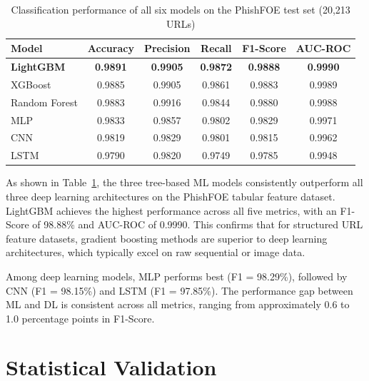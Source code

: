 \begin{table}[H]
    \caption{Classification performance of all six models on the PhishFOE test set (20,213 URLs)}
    \label{tab:perf_metrics}
    \vspace{6pt}
    \centering
    \begin{tabular}{|l|c|c|c|c|c|}
        \hline
        \textbf{Model} & \textbf{Accuracy} & \textbf{Precision} & \textbf{Recall} & \textbf{F1-Score} & \textbf{AUC-ROC} \\
        \hline
        \textbf{LightGBM}  & \textbf{0.9891} & \textbf{0.9905} & \textbf{0.9872} & \textbf{0.9888} & \textbf{0.9990} \\
        \hline
        XGBoost        & 0.9885 & 0.9905 & 0.9861 & 0.9883 & 0.9989 \\
        \hline
        Random Forest  & 0.9883 & 0.9916 & 0.9844 & 0.9880 & 0.9988 \\
        \hline
        MLP            & 0.9833 & 0.9857 & 0.9802 & 0.9829 & 0.9971 \\
        \hline
        CNN            & 0.9819 & 0.9829 & 0.9801 & 0.9815 & 0.9962 \\
        \hline
        LSTM           & 0.9790 & 0.9820 & 0.9749 & 0.9785 & 0.9948 \\
        \hline
    \end{tabular}
\end{table}

As shown in Table~\ref{tab:perf_metrics}, the three tree-based ML models consistently outperform all three deep learning architectures on the PhishFOE tabular feature dataset. LightGBM achieves the highest performance across all five metrics, with an F1-Score of 98.88\% and AUC-ROC of 0.9990. This confirms that for structured URL feature datasets, gradient boosting methods are superior to deep learning architectures, which typically excel on raw sequential or image data.

Among deep learning models, MLP performs best (F1 = 98.29\%), followed by CNN (F1 = 98.15\%) and LSTM (F1 = 97.85\%). The performance gap between ML and DL is consistent across all metrics, ranging from approximately 0.6 to 1.0 percentage points in F1-Score.

\section{Statistical Validation}

